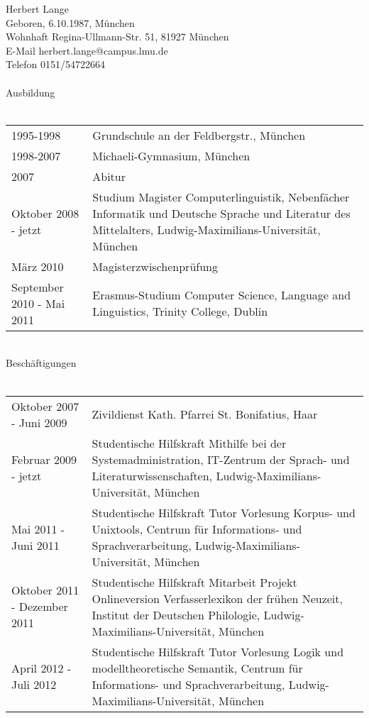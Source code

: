 Herbert Lange \\
Geboren, 6.10.1987, München \\
Wohnhaft Regina-Ullmann-Str. 51, 81927 München \\
E-Mail herbert.lange@campus.lmu.de \\
Telefon 0151/54722664 \\
\\
Ausbildung \\
\\
\begin{tabular}{l p{9cm}}
1995-1998 & Grundschule an der Feldbergstr., München \\
1998-2007 & Michaeli-Gymnasium, München \\
2007 & Abitur \\
Oktober 2008 - jetzt & Studium Magister Computerlinguistik, Nebenfächer Informatik und Deutsche Sprache und Literatur des Mittelalters, Ludwig-Maximilians-Universität, München \\
März 2010 & Magisterzwischenprüfung \\
September 2010 - Mai 2011 & Erasmus-Studium Computer Science, Language and Linguistics, Trinity College, Dublin \\
\end{tabular}
\pagebreak
\\
Beschäftigungen \\
\\
\begin{tabular}{l p{9cm}}
Oktober 2007 - Juni 2009 & Zivildienst Kath. Pfarrei St. Bonifatius, Haar \\
Februar 2009 - jetzt & Studentische Hilfskraft Mithilfe bei der Systemadministration, IT-Zentrum der Sprach- und Literaturwissenschaften, Ludwig-Maximilians-Universität, München \\
Mai 2011 - Juni 2011 & Studentische Hilfskraft Tutor Vorlesung Korpus- und Unixtools, Centrum für Informations- und Sprachverarbeitung, Ludwig-Maximilians-Universität, München \\
Oktober 2011 - Dezember 2011 & Studentische Hilfskraft Mitarbeit Projekt Onlineversion Verfasserlexikon der frühen Neuzeit, Institut der Deutschen Philologie, Ludwig-Maximilians-Universität, München \\
April 2012 - Juli 2012 & Studentische Hilfskraft Tutor Vorlesung Logik und modelltheoretische Semantik, Centrum für Informations- und Sprachverarbeitung, Ludwig-Maximilians-Universität, München \\
\end{tabular}